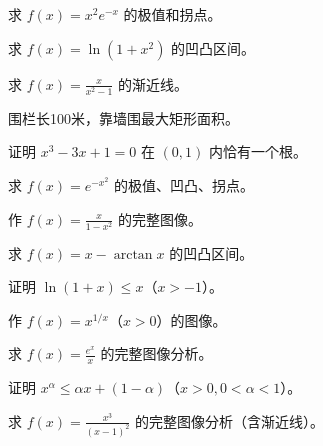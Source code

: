 \begin{exercise}[4] 求 \(f(x)=x^2e^{-x}\) 的极值和拐点。\end{exercise}
\begin{exercise}[4] 求 \(f(x)=\ln(1+x^2)\) 的凹凸区间。\end{exercise}
\begin{exercise}[4] 求 \(f(x)=\frac{x}{x^2-1}\) 的渐近线。\end{exercise}
\begin{exercise}[4] 围栏长100米，靠墙围最大矩形面积。\end{exercise}
\begin{exercise}[4] 证明 \(x^3-3x+1=0\) 在 \((0,1)\) 内恰有一个根。\end{exercise}
\begin{exercise}[5] 求 \(f(x)=e^{-x^2}\) 的极值、凹凸、拐点。\end{exercise}
\begin{exercise}[5] 作 \(f(x)=\frac{x}{1-x^2}\) 的完整图像。\end{exercise}
\begin{exercise}[5] 求 \(f(x)=x-\arctan x\) 的凹凸区间。\end{exercise}
\begin{exercise}[5] 证明 \(\ln(1+x) \le x\)（\(x>-1\)）。\end{exercise}
\begin{exercise}[6] 作 \(f(x)=x^{1/x}\)（\(x>0\)）的图像。\end{exercise}
\begin{exercise}[6] 求 \(f(x)=\frac{e^x}{x}\) 的完整图像分析。\end{exercise}
\begin{exercise}[6] 证明 \(x^\alpha \le \alpha x + (1-\alpha)\)（\(x>0, 0<\alpha<1\)）。\end{exercise}
\begin{exercise}[7] 求 \(f(x)=\frac{x^3}{(x-1)^2}\) 的完整图像分析（含渐近线）。\end{exercise}
